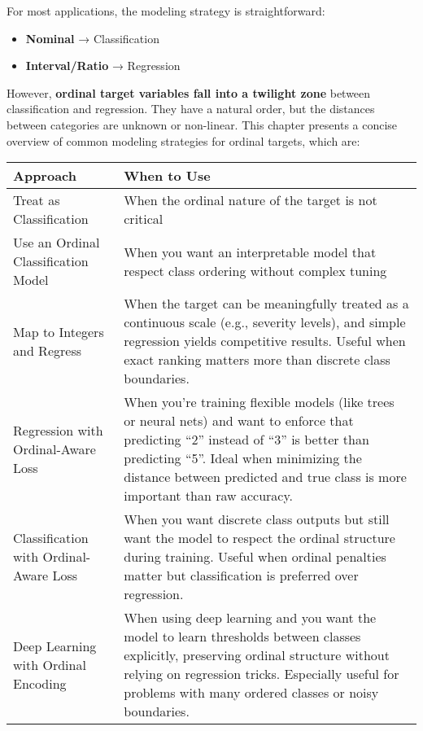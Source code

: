 \documentclass[12pt,openany]{book}
\begin{document}
\vspace{10pt}

For most applications, the modeling strategy is straightforward:
\begin{itemize}
    \item \textbf{Nominal} → Classification
    \item \textbf{Interval/Ratio} → Regression
\end{itemize}

However, \textbf{ordinal target variables fall into a twilight zone} between 
classification and regression. They have a natural order, but the distances 
between categories are unknown or non-linear. This chapter presents a 
concise overview of common modeling strategies for ordinal targets, which are:

\begin{minipage}{\textwidth}
\begin{center}
\renewcommand{\arraystretch}{1.5} %
\begin{tabular}{lp{9cm}}
\toprule
\textbf{Approach} & \textbf{When to Use} \\
\midrule
Treat as Classification & When the ordinal nature of the target is not critical \\
Use an Ordinal Classification Model & When you want an interpretable model that respect class ordering without complex tuning \\
Map to Integers and Regress & When the target can be meaningfully treated as a continuous scale (e.g., severity levels), and simple regression yields competitive results. Useful when exact ranking matters more than discrete class boundaries. \\
Regression with Ordinal-Aware Loss & When you're training flexible models (like trees or neural nets) and want to enforce that predicting “2” instead of “3” is better than predicting “5”. Ideal when minimizing the distance between predicted and true class is more important than raw accuracy. \\
Classification with Ordinal-Aware Loss & When you want discrete class outputs but still want the model to respect the ordinal structure during training. Useful when ordinal penalties matter but classification is preferred over regression. \\
Deep Learning with Ordinal Encoding & When using deep learning and you want the model to learn thresholds between classes explicitly, preserving ordinal structure without relying on regression tricks. Especially useful for problems with many ordered classes or noisy boundaries. \\
\bottomrule
\end{tabular}
\end{center}
\end{minipage}
\end{document}
